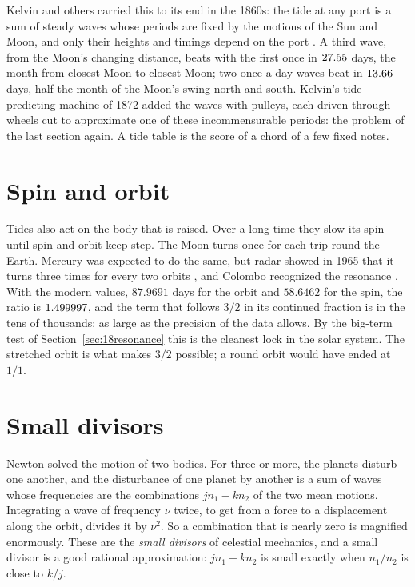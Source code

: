 Kelvin and others carried this to its end in the 1860s: the tide at any port is a sum of steady waves whose periods are fixed by the motions of the Sun and Moon, and only their heights and timings depend on the port \citep{Thomson1881}. A third wave, from the Moon's changing distance, beats with the first once in $27.55$ days, the month from closest Moon to closest Moon; two once-a-day waves beat in $13.66$ days, half the month of the Moon's swing north and south. Kelvin's tide-predicting machine of 1872 added the waves with pulleys, each driven through wheels cut to approximate one of these incommensurable periods: the problem of the last section again. A tide table is the score of a chord of a few fixed notes.

\section{Spin and orbit}\label{sec:nw-spin}

Tides also act on the body that is raised. Over a long time they slow its spin until spin and orbit keep step. The Moon turns once for each trip round the Earth. Mercury was expected to do the same, but radar showed in 1965 that it turns three times for every two orbits \citep{PettengillDyce1965}, and Colombo recognized the resonance \citep{Colombo1965}. With the modern values, $87.9691$ days for the orbit and $58.6462$ for the spin, the ratio is $1.499997$, and the term that follows $3/2$ in its continued fraction is in the tens of thousands: as large as the precision of the data allows. By the big-term test of Section~\ref{sec:18resonance} this is the cleanest lock in the solar system. The stretched orbit is what makes $3/2$ possible; a round orbit would have ended at $1/1$.

\section{Small divisors}\label{sec:nw-small}

Newton solved the motion of two bodies. For three or more, the planets disturb one another, and the disturbance of one planet by another is a sum of waves whose frequencies are the combinations $j n_1 - k n_2$ of the two mean motions. Integrating a wave of frequency $\nu$ twice, to get from a force to a displacement along the orbit, divides it by $\nu^2$. So a combination that is nearly zero is magnified enormously. These are the \emph{small divisors} of celestial mechanics, and a small divisor is a good rational approximation: $j n_1 - k n_2$ is small exactly when $n_1/n_2$ is close to $k/j$.

